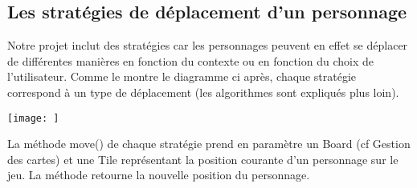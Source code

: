 \subsection{Les stratégies de déplacement d'un personnage}

Notre projet inclut des stratégies car les personnages peuvent en effet se déplacer de différentes manières en fonction du contexte ou en fonction du choix de l'utilisateur. Comme le montre le diagramme ci après, chaque stratégie correspond à un type de déplacement (les algorithmes sont expliqués plus loin). \\[0.5cm]

\centerline{\texttt{[image: ]}}

La méthode move() de chaque stratégie prend en paramètre un Board (cf Gestion des cartes) et une Tile représentant la position courante d'un personnage sur le jeu. La méthode retourne la nouvelle position du personnage.
